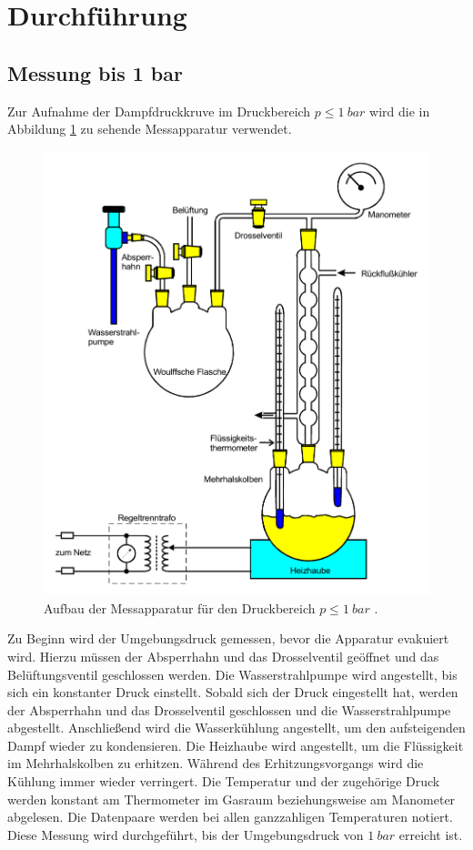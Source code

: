 \section{Durchführung}
\label{sec:Durchführung}

\subsection{Messung bis 1 bar}

Zur Aufnahme der Dampfdruckkruve im Druckbereich  $p \leq \qty{1}{bar}$ wird die 
in Abbildung \ref{fig:tiefdruck} zu sehende Messapparatur verwendet. 
\begin{figure} [H]
    \centering
    \includegraphics[width=12cm] {pictures/tiefdruck.pdf} 
    \caption{Aufbau der Messapparatur für den Druckbereich $p \leq \qty{1}{bar}$  \cite[6]{v203}.}
    \label{fig:tiefdruck}
\end{figure} 

Zu Beginn wird der Umgebungsdruck gemessen, bevor die Apparatur evakuiert wird.
Hierzu müssen der Absperrhahn und das Drosselventil geöffnet und das Belüftungsventil geschlossen werden.
Die Wasserstrahlpumpe wird angestellt, bis sich ein konstanter Druck einstellt. 
Sobald sich der Druck eingestellt hat, 
werden der Absperrhahn und das Drosselventil geschlossen und die Wasserstrahlpumpe abgestellt.
Anschließend wird die Wasserkühlung angestellt, um den aufsteigenden Dampf wieder zu kondensieren. 
Die Heizhaube wird angestellt, um die Flüssigkeit im Mehrhalskolben zu erhitzen. 
Während des Erhitzungsvorgangs wird die Kühlung immer wieder verringert. 
Die Temperatur und der zugehörige Druck werden konstant am Thermometer im Gasraum beziehungsweise am Manometer abgelesen. 
Die Datenpaare werden bei allen ganzzahligen Temperaturen notiert. 
Diese Messung wird durchgeführt, bis der Umgebungsdruck von $\qty{1}{bar}$ erreicht ist.


